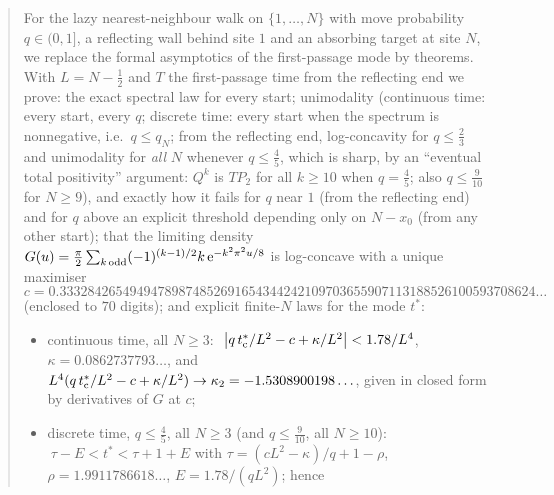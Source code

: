 \documentclass[11pt,a4paper]{article}
\theoremstyle{definition}
\theoremstyle{remark}
\newcommand{\ee}{\mathrm{e}}
\begin{document}
\begin{abstract}
For the lazy nearest-neighbour walk on $\{1,\dots,N\}$ with move probability $q\in(0,1]$, a reflecting
wall behind site $1$ and an absorbing target at site $N$, we replace the formal asymptotics of the
first-passage mode by theorems. With $L=N-\frac12$ and $T$ the first-passage time from the reflecting end we prove:
the exact spectral law for every start; unimodality (continuous time: every start, every $q$; discrete time:
every start when the spectrum is nonnegative, i.e.\ $q\le q_N$; from the reflecting end, log-concavity for $q\le\frac23$ and unimodality
for \emph{all} $N$ whenever $q\le\frac45$, which is sharp, by an ``eventual total positivity'' argument: $Q^k$ is
$TP_2$ for all $k\ge10$ when $q=\frac45$; also $q\le\frac9{10}$ for $N\ge9$), and exactly how it fails for
$q$ near $1$ (from the reflecting end) and for $q$ above an explicit threshold depending only on $N-x_0$ (from any
other start); that the limiting density $G(u)=\frac\pi2\sum_{k\,\rm odd}(-1)^{(k-1)/2}k\,\ee^{-k^2\pi^2u/8}$ is
log-concave with a unique maximiser
\[
   c=0.33328426549494789874852691654344242109703655907113188526100593708624\ldots
\]
(enclosed to $70$ digits); and explicit finite-$N$ laws for the mode $t^*$:
\begin{itemize}
\item continuous time, all $N\ge3$: $\ \bigl|q\,t^*_{\rm c}/L^{2}-c+\kappa/L^{2}\bigr|<1.78/L^{4}$,
 $\kappa=0.0862737793\ldots$, and $L^4(q\,t^*_{\rm c}/L^2-c+\kappa/L^2)\to\kappa_2=-1.5308900198\ldots$, given in closed
 form by derivatives of $G$ at $c$;
\item discrete time, $q\le\frac45$, all $N\ge3$ (and $q\le\frac9{10}$, all $N\ge10$): $\ \tau-E<t^{*}<\tau+1+E$ with
 $\tau=(cL^2-\kappa)/q+1-\rho$, $\rho=1.9911786618\ldots$, $E=1.78/(qL^2)$; hence

\end{itemize}
\end{abstract}
\end{document}
